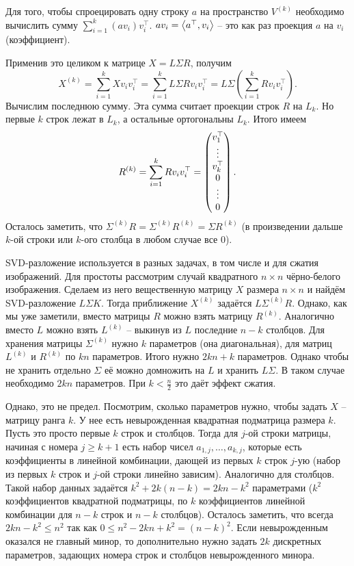 Для того, чтобы спроецировать одну строку $a$ на пространство $V^{(k)}$ необходимо вычислить сумму $\sum_{i=1}^k (av_i) v_i^{\top}$. $av_i = \left\langle a^{\top}, v_i \right\rangle$ -- это как раз проекция $a$ на $v_i$ (коэффициент).

Применив это целиком к матрице $X=L\Sigma R$, получим 
$$X^{(k)}=\sum_{i=1}^k Xv_iv_i^{\top}=\sum_{i=1}^k L\Sigma Rv_iv_i^{\top}=L\Sigma \left(\sum_{i=1}^k Rv_iv_i^{\top}\right).$$
Вычислим последнюю сумму. Эта сумма считает проекции строк $R$ на $L_k$. Но первые $k$ строк лежат в $L_k$, а остальные ортогональны $L_k$. Итого имеем
$$R^{(k)}=\sum_{i=1}^k Rv_iv_i^{\top} = \begin{pmatrix} v_1^{\top} \\ \vdots \\ v_k^{\top} \\ 0 \\ \vdots \\ 0 \end{pmatrix}.$$
Осталось заметить, что $\Sigma^{(k)} R= \Sigma^{(k)}R^{(k)}=\Sigma R^{(k)}$ (в произведении дальше $k$-ой строки или $k$-ого столбца в любом случае все 0).
\endproof
\ethrm 

SVD-разложение используется в разных задачах, в том числе и для сжатия изображений.  Для простоты рассмотрим случай квадратного $n \times n$ чёрно-белого изображения. Сделаем из него вещественную матрицу $X$ размера $n \times n$ и найдём SVD-разложение $L \Sigma K$. Тогда приближение $X^{(k)}$ задаётся $L\Sigma^{(k)}R$. Однако, как мы уже заметили, вместо матрицы $R$ можно взять матрицу $R^{(k)}$. Аналогично вместо $L$ можно взять $L^{(k)}$ -- выкинув из $L$ последние $n-k$ столбцов. Для хранения матрицы $\Sigma^{(k)}$ нужно $k$ параметров (она диагональная), для матриц $L^{(k)}$ и $R^{(k)}$ по $kn$ параметров. Итого нужно $2kn+k$ параметров. Однако чтобы не хранить отдельно $\Sigma$ её можно домножить на $L$ и хранить $L\Sigma$. В таком случае необходимо $2kn$ параметров. При $k<\frac{n}{2}$ это даёт эффект сжатия. 

Однако, это не предел. Посмотрим, сколько параметров нужно, чтобы задать $X$ -- матрицу ранга $k$. У нее есть невырожденная квадратная подматрица размера $k$. Пусть это просто первые $k$ строк и столбцов. Тогда для $j$-ой строки матрицы, начиная с номера $j \geq k+1$ есть набор чисел $a_{1,j},\dots,a_{k,j}$, которые есть коэффициенты в линейной комбинации, дающей из первых $k$ строк $j$-ую (набор из первых $k$ строк и $j$-ой строки линейно зависим). Аналогично для столбцов. Такой набор данных задаётся $k^2+ 2k(n-k)=2kn-k^2$ параметрами ($k^2$ коэффициентов квадратной подматрицы, по $k$ коэффициентов линейной комбинации для $n - k$ строк и $n - k$ столбцов). Осталось заметить, что всегда $2kn - k^2\leq n^2$ так как $0\leq n^2-2kn+k^2=(n-k)^2$. Если невырожденным оказался не главный минор, то дополнительно нужно задать $2k$ дискретных параметров, задающих номера строк и столбцов невырожденного минора.